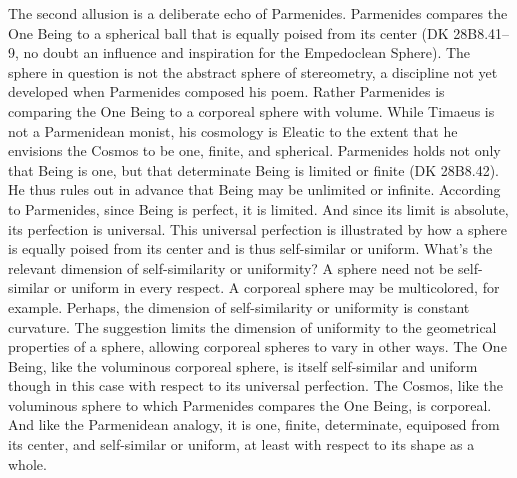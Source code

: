 The second allusion is a deliberate echo of Parmenides. Parmenides compares the One Being to a spherical ball that is equally poised from its center (DK 28B8.41--9, no doubt an influence and inspiration for the Empedoclean Sphere). The sphere in question is not the abstract sphere of stereometry, a discipline not yet developed when Parmenides composed his poem. Rather Parmenides is comparing the One Being to a corporeal sphere with volume. While Timaeus is not a Parmenidean monist, his cosmology is Eleatic to the extent that he envisions the Cosmos to be one, finite, and spherical. Parmenides holds not only that Being is one, but that determinate Being is limited or finite (DK 28B8.42). He thus rules out in advance that Being may be unlimited or infinite. According to Parmenides, since Being is perfect, it is limited. And since its limit is absolute, its perfection is universal. This universal perfection is illustrated by how a sphere is equally poised from its center and is thus self-similar or uniform. What's the relevant dimension of self-similarity or uniformity? A sphere need not be self-similar or uniform in every respect. A corporeal sphere may be multicolored, for example. Perhaps, the dimension of self-similarity or uniformity is constant curvature. The suggestion limits the dimension of uniformity to the geometrical properties of a sphere, allowing corporeal spheres to vary in other ways.  The One Being, like the voluminous corporeal sphere, is itself self-similar and uniform though in this case with respect to its universal perfection. The Cosmos, like the voluminous sphere to which Parmenides compares the One Being, is corporeal. And like the Parmenidean analogy, it is one, finite, determinate, equiposed from its center, and self-similar or uniform, at least with respect to its shape as a whole.


